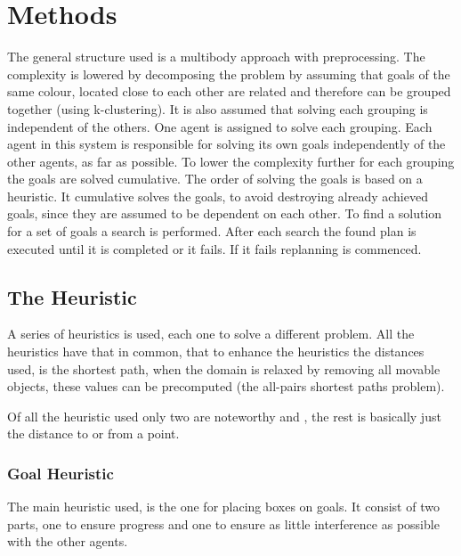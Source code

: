\documentclass[letterpaper]{article}
\begin{document}
\section{Methods}
%		
%		
%		
	The general structure used is a multibody approach with preprocessing. The complexity is lowered by decomposing the problem by assuming that goals of the same colour, located close to each other are related and therefore can be grouped together (using k-clustering). It is also assumed that solving each grouping is independent of the others. One agent is assigned to solve each grouping. Each agent in this system is responsible for solving its own goals independently of the other agents, as far as possible. 
	To lower the complexity further for each grouping the goals are solved cumulative. The order of solving the goals is based on a heuristic. It cumulative solves the goals, to avoid destroying already achieved goals, since they are assumed to be dependent on each other. To find a solution for a set of goals a search is performed. After each search the found plan is executed until it is completed or it fails. If it fails replanning is commenced.

 
	\subsection{The Heuristic}
		A series of heuristics is used, each one to solve a different problem. All the heuristics have that in common, that to enhance the heuristics the distances used, is the shortest path, when the domain is relaxed by removing all movable objects, these values can be precomputed (the all-pairs shortest paths problem).
		
		Of all the heuristic used only two are noteworthy  and , the rest is basically just the distance to or from a point.
		\subsubsection{Goal Heuristic}\label{Goal1}
			The main heuristic used, is the one for placing boxes on goals. It consist of two parts, one to ensure progress and one to ensure as little interference as possible with the other agents.
			
\end{document}
